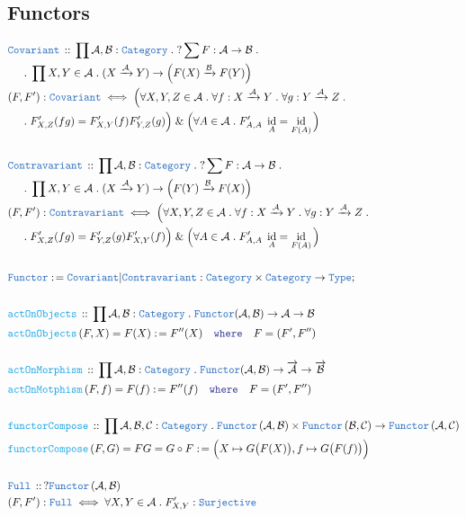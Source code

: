 \documentclass[12pt]{scrartcl}
\newcommand{\TYPE}[1]{\textcolor{NavyBlue}{\mathtt{#1}}}
\newcommand{\FUNC}[1]{\textcolor{Cerulean}{\mathtt{#1}}}
\newcommand{\LOGIC}[1]{\textcolor{Blue}{\mathtt{#1}}}
\renewcommand{\.}{\; . \;}
\newcommand{\de}{: \kern 0.1pc =}
\newcommand{\where}{\LOGIC{where}}
\newcommand{\Act}[1]{\left( #1 \right)}
\newcommand{\DeclareType}[2]{& \TYPE{#1} \, :: \, #2 \\}
\newcommand{\DefineType}[3]{& #1 : \TYPE{#2} \iff #3 \\}
\newcommand{\DeclareFunc}[2]{& \FUNC{#1} \, :: \, #2 \\}
\newcommand{\DefineNamedFunc}[4]{&  \FUNC{#1}\Act{#2} = #3 \de #4 \\}
\newcommand{\NewLine}{\\ & \kern 1pc}
\newcommand{\Page}[1]{ \begin{align*} #1 \end{align*}   }
\renewcommand{\And}{\; \& \;}
\newcommand{\Type}{\TYPE{Type}}
\DeclareMathOperator*{\id}{id}
\newcommand{\Cat}{\TYPE{Category}}
\newcommand{\Func}[2]{\TYPE{Functor}\left( #1, #2 \right)}
\newcommand{\Arrow}{\xrightarrow}
\newcommand{\Conclude}[3]{& #1 \de #2 : #3; \\}
\newcommand{\Cov}{\TYPE{Covariant}}
\newcommand{\Contra}{\TYPE{Contravariant}}
\newcommand{\C}{\mathcal{C}}
\begin{document}
\subsection{Functors}
\Page{
	\DeclareType{Covariant}{ \prod \mathcal{A},\mathcal{B} : \Cat \. ?\sum F : \mathcal{A} \to \mathcal{B} \. 
		\NewLine \. \prod  X,Y \in \mathcal{A} \. (X \Arrow{\mathcal{A}} Y) \to \Big(F(X) \Arrow{\mathcal{B}} F(Y)\Big)  }
	\DefineType{(F,F')}{Covariant}{ \Big( \forall X,Y,Z \in \mathcal{A} \.  \forall f : X \Arrow{\mathcal{A}} Y \.        
		\forall g : Y \Arrow{\mathcal{A}} Z \. \NewLine \. F'_{X,Z}(fg) = F'_{X,Y}(f)F'_{Y,Z}(g) \Big)
			\And \Big( \forall A \in \mathcal{A} \. F'_{A,A}\; \id_A = \id_{F(A)} \Big)
		}
	\\
	\DeclareType{Contravariant}{ \prod \mathcal{A},\mathcal{B} : \Cat \. ?\sum F : \mathcal{A} \to \mathcal{B} \. 
		\NewLine \. \prod  X,Y \in \mathcal{A} \. (X \Arrow{\mathcal{A}} Y) \to \Big(F(Y) \Arrow{\mathcal{B}} F(X)\Big) }
	\DefineType{(F,F')}{Contravariant}{  \Big( \forall X,Y,Z \in \mathcal{A} \.  \forall f : X \Arrow{\mathcal{A}} Y \.        
		\forall g : Y \Arrow{\mathcal{A}} Z \. \NewLine \.  F'_{X,Z}(fg) = F'_{Y,Z}(g)F'_{X,Y}(f) \Big)
		\And \Big( \forall A \in \mathcal{A} \. F'_{A,A}\; \id_A = \id_{F(A)} \Big)}
	\\
	\Conclude{\TYPE{Functor}}{\Cov | \Contra}{ \Cat \times \Cat \to  \Type}
	\\
	\DeclareFunc{actOnObjects}{  \prod \mathcal{A}, \mathcal{B}  :  \Cat \. 
		\TYPE{Functor}(\mathcal{A},\mathcal{B}) \to    
		\mathcal{A} \to \mathcal{B}  }
	\DefineNamedFunc{actOnObjects}{F,X}{F(X)}{F''(X) \quad \where \quad  F = (F',F'')}
	\\
	\DeclareFunc{actOnMorphism}{  \prod \mathcal{A}, \mathcal{B}  :  \Cat \. 
		 \TYPE{Functor}(\mathcal{A},\mathcal{B}) \to    
		\overrightarrow{\mathcal{A}} \to \overrightarrow{\mathcal{B}}  }
	\DefineNamedFunc{actOnMotphism}{F,f}{F(f)}{F''(f) \quad \where \quad  F = (F',F'')}
	\\
	\DeclareFunc{functorCompose}{ \prod \mathcal{A},\mathcal{B},\mathcal{C} : \Cat \.                    
		\Func{\mathcal{A}}{\mathcal{B}} \times \Func{\mathcal{B}}{\C} \to \Func{\mathcal{A}}{\C}}
	\DefineNamedFunc{functorCompose}{F, G} { FG = G \circ F}{ \Big(X \mapsto G\big(F(X)\big), f \mapsto G\big(F(f)\big) \Big) }
	\\
	\DeclareType{Full}{?\Func{\mathcal{A}}{\mathcal{B}}}
	\DefineType{(F,F')}{ Full }{ \forall X,Y \in \mathcal{A} \. F'_{X,Y} : \TYPE{Surjective}}
	\\
}
\end{document}
